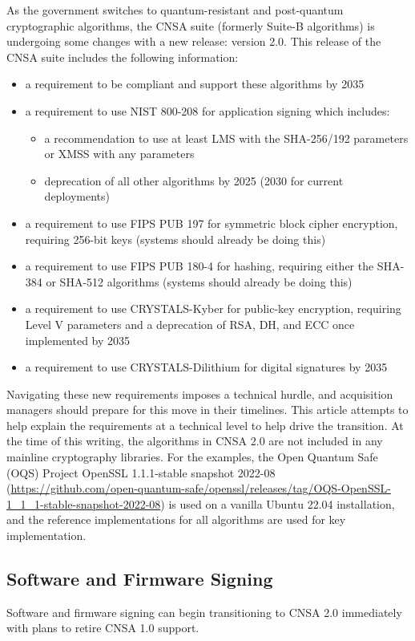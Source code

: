 As the government switches to quantum-resistant and post-quantum cryptographic algorithms, the CNSA suite (formerly Suite-B algorithms) is undergoing some changes with a new release: version 2.0. This release of the CNSA suite includes the following information:\autocite{20220919:cnsa}
\begin{itemize}
	\item a requirement to be compliant and support these algorithms by 2035
	\item a requirement to use NIST 800-208 for application signing which includes:
	\begin{itemize}
		\item a recommendation to use at least LMS with the SHA-256/192 parameters or XMSS with any parameters
		\item deprecation of all other algorithms by 2025 (2030 for current deployments)
	\end{itemize}
	\item a requirement to use FIPS PUB 197 for symmetric block cipher encryption, requiring 256-bit keys (systems should already be doing this)
	\item a requirement to use FIPS PUB 180-4 for hashing, requiring either the SHA-384 or SHA-512 algorithms (systems should already be doing this)
	\item a requirement to use CRYSTALS-Kyber for public-key encryption, requiring Level V parameters and a deprecation of RSA, DH, and ECC once implemented by 2035
	\item a requirement to use CRYSTALS-Dilithium for digital signatures by 2035
\end{itemize}

Navigating these new requirements imposes a technical hurdle, and acquisition managers should prepare for this move in their timelines. This article attempts to help explain the requirements at a technical level to help drive the transition. At the time of this writing, the algorithms in CNSA 2.0 are not included in any mainline cryptography libraries. For the examples, the Open Quantum Safe (OQS) Project OpenSSL 1.1.1-stable snapshot 2022-08 (\url{https://github.com/open-quantum-safe/openssl/releases/tag/OQS-OpenSSL-1_1_1-stable-snapshot-2022-08}) is used on a vanilla Ubuntu 22.04 installation, and the reference implementations for all algorithms are used for key implementation.

\subsection{Software and Firmware Signing}
Software and firmware signing can begin transitioning to CNSA 2.0 immediately with plans to retire CNSA 1.0 support.

